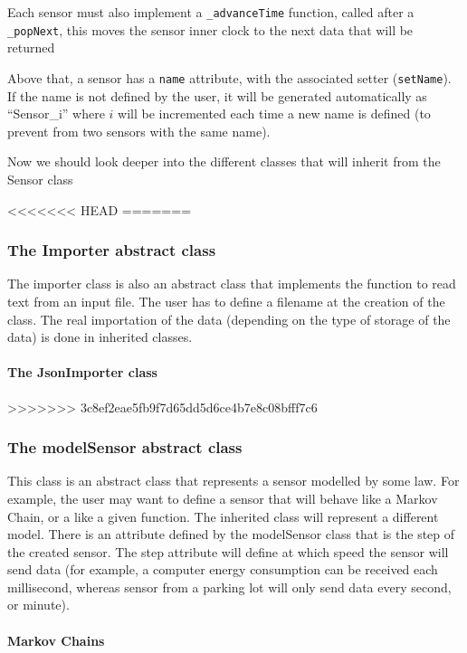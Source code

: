 Each sensor must also implement a \verb!_advanceTime! function, called after a
\verb!_popNext!, this moves the sensor inner clock to the next data that will
be returned

Above that, a sensor has a \verb!name! attribute, with the associated setter
(\verb!setName!). If the name is not defined by the user, it will be generated
automatically as ``Sensor\_i'' where $i$ will be incremented each time a new
name is defined (to prevent from two sensors with the same name).

Now we should look deeper into the different classes that will inherit from the
Sensor class

<<<<<<< HEAD
=======
\subsubsection{The Importer abstract class}

The importer class is also an abstract class that implements the function
to read text from an input file. The user has to define a filename at the
creation of the class. The real importation of the data (depending on the type
of storage of the data) is done in inherited classes.

\paragraph{The JsonImporter class}



>>>>>>> 3c8ef2eae5fb9f7d65dd5d6ce4b7e8c08bfff7c6

\subsubsection{The modelSensor abstract class}

This class is an abstract class that represents a sensor modelled by some
law. For example, the user may want to define a sensor that will behave like a
Markov Chain, or a like a given function. The inherited class will represent a
different model. There is an attribute defined by the modelSensor class that is
the step of the created sensor. The step attribute will define at which speed
the sensor will send data (for example, a computer energy consumption can be
received each millisecond, whereas sensor from a parking lot will only send
data every second, or minute).

\paragraph{Markov Chains}


